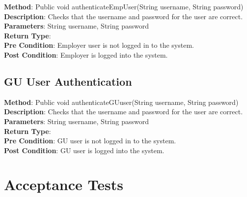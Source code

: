 \documentclass{l3deliverable}
\begin{document}
\textbf{Method}: Public void authenticateEmpUser(String username, String password)\\
\textbf{Description}: Checks that the username and password for the user are correct.\\
\textbf{Parameters}: String username, String password\\
\textbf{Return Type}:\\
\textbf{Pre Condition}: Employer user is not logged in to the system.\\
\textbf{Post Condition}: Employer is logged into the system.\\

\subsection{GU User Authentication}

\textbf{Method}: Public void authenticateGUuser(String username, String password)\\
\textbf{Description}: Checks that the username and password for the user are correct. \\
\textbf{Parameters}: String username, String password\\
\textbf{Return Type}:\\
\textbf{Pre Condition}: GU user is not logged in to the system.\\
\textbf{Post Condition}: GU user is logged into the system.\\


\section{Acceptance Tests}
\end{document}
